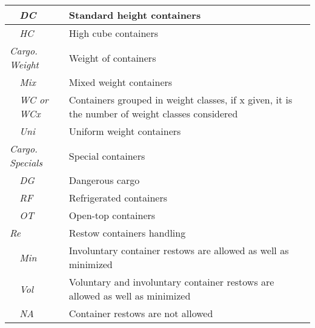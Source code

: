 \documentclass[preprint,12pt,authoryear]{elsarticle}
\begin{document}
\begin{table}[h!]
{\begin{tabular}{lll}
    \textit{}        & \textit{DC}             & Standard height containers                                                                         \\ \hline
    \textit{}        & \textit{HC}         & High cube containers                                                                  \\ \hline
    \multicolumn{2}{l}{\textit{Cargo. Weight}}              & Weight of containers                                                                     \\ \hline
    \textit{}        & \textit{Mix}             & Mixed weight containers                                                                           \\ \hline
    \textit{}        & \textit{WC or WCx}         & Containers grouped in weight classes, if x given, it is the number of weight classes considered                                                                  \\ \hline
    \textit{}        & \textit{Uni}               & Uniform weight containers                                                                        \\ \hline
    \multicolumn{2}{l}{\textit{Cargo. Specials}}              & Special containers                                                                    \\ \hline
    \textit{}        & \textit{DG}             & Dangerous cargo                                                                          \\ \hline
    \textit{}        & \textit{RF}         & Refrigerated containers                                                                  \\ \hline
    \textit{}        & \textit{OT}                & Open-top containers                          \\ \hline
    \multicolumn{2}{l}{\textit{Re}}         & Restow containers handling                                                                                       \\ \hline
    \textit{}        & \textit{Min}            &
    Involuntary container restows are allowed as well as minimized                        \\ \hline
    \textit{}        & \textit{Vol}            & Voluntary and involuntary container restows are allowed as well as minimized                           \\ \hline
    \textit{}        & \textit{NA}         & Container restows are not allowed                                                         \\ \hline

\end{tabular}}
\end{table}
\end{document}
